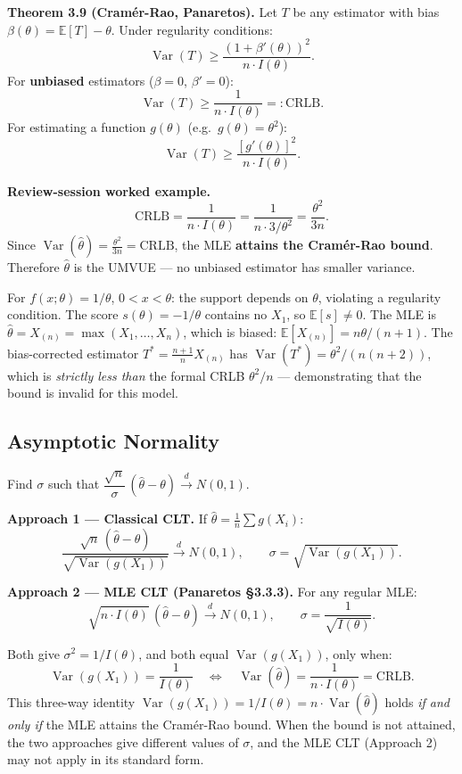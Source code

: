 \documentclass[11pt,a4paper]{article}
\newcommand{\E}{\mathbb{E}}
\newcommand{\Var}{\operatorname{Var}}
\newcommand{\convd}{\xrightarrow{\,d\,}}
\begin{document}
\textbf{Theorem 3.9 (Cramér-Rao, Panaretos).} Let $T$ be any estimator with bias $\beta(\theta) = \E[T]-\theta$. Under regularity conditions:
\[
  \Var(T) \geq \frac{(1+\beta'(\theta))^2}{n\cdot I(\theta)}.
\]
For \textbf{unbiased} estimators ($\beta=0$, $\beta'=0$):
\[
  \Var(T) \geq \frac{1}{n\cdot I(\theta)} =: \text{CRLB}.
\]
For estimating a function $g(\theta)$ (e.g.\ $g(\theta)=\theta^2$):
\[
  \Var(T) \geq \frac{[g'(\theta)]^2}{n\cdot I(\theta)}.
\]

\textbf{Review-session worked example.}
\[
  \text{CRLB} = \frac{1}{n\cdot I(\theta)} = \frac{1}{n\cdot 3/\theta^2} = \frac{\theta^2}{3n}.
\]
Since $\Var(\hat\theta) = \frac{\theta^2}{3n} = \text{CRLB}$, the MLE \textbf{attains the Cramér-Rao bound}. Therefore $\hat\theta$ is the UMVUE — no unbiased estimator has smaller variance.

\begin{tcolorbox}[warnbox, title={When the bound is NOT attained — Uniform$(0,\theta)$}]
For $f(x;\theta)=1/\theta$, $0<x<\theta$: the support depends on $\theta$, violating a regularity condition. The score $s(\theta)=-1/\theta$ contains no $X_1$, so $\E[s]\neq 0$. The MLE is $\hat\theta=X_{(n)}=\max(X_1,\ldots,X_n)$, which is biased: $\E[X_{(n)}]=n\theta/(n+1)$. The bias-corrected estimator $T^*=\frac{n+1}{n}X_{(n)}$ has $\Var(T^*)=\theta^2/(n(n+2))$, which is \emph{strictly less than} the formal CRLB $\theta^2/n$ — demonstrating that the bound is invalid for this model.
\end{tcolorbox}

\subsection{Asymptotic Normality}

\begin{tcolorbox}[questionbox, title={Question 8}]
Find $\sigma$ such that $\dfrac{\sqrt{n}}{\sigma}\,(\hat\theta - \theta) \convd N(0,1)$.
\end{tcolorbox}

\textbf{Approach 1 — Classical CLT.} If $\hat\theta = \frac{1}{n}\sum g(X_i)$:
\[
  \frac{\sqrt{n}\,(\hat\theta - \theta)}{\sqrt{\Var(g(X_1))}} \convd N(0,1),
  \qquad \sigma = \sqrt{\Var(g(X_1))}.
\]

\textbf{Approach 2 — MLE CLT (Panaretos §3.3.3).} For any regular MLE:
\[
  \sqrt{n\cdot I(\theta)}\,(\hat\theta - \theta) \convd N(0,1),
  \qquad \sigma = \frac{1}{\sqrt{I(\theta)}}.
\]

\begin{tcolorbox}[successbox, title={Why both approaches give the same $\sigma$ when the CR bound is attained}]
Both give $\sigma^2 = 1/I(\theta)$, and both equal $\Var(g(X_1))$, only when:
\[
  \Var(g(X_1)) = \frac{1}{I(\theta)} \quad\Longleftrightarrow\quad \Var(\hat\theta) = \frac{1}{n\cdot I(\theta)} = \text{CRLB}.
\]
This three-way identity $\Var(g(X_1)) = 1/I(\theta) = n\cdot\Var(\hat\theta)$ holds \emph{if and only if} the MLE attains the Cramér-Rao bound. When the bound is not attained, the two approaches give different values of $\sigma$, and the MLE CLT (Approach 2) may not apply in its standard form.
\end{tcolorbox}
\end{document}
